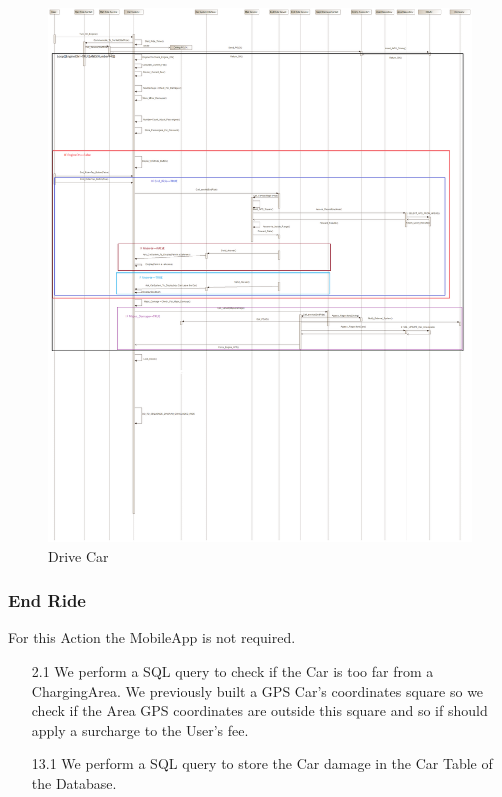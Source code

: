 \documentclass[12pt]{article}
\begin{document}
\begin{figure}[h]
\vspace{-2cm}
	\centering
	\includegraphics[width=.9\textwidth]{../Images/Sequence_Final/Drive_Car}
	\caption{Drive Car}
\end{figure}
\clearpage
\subsubsection{End Ride}
For this Action the MobileApp is not required.
\begin{enumerate}
	\item[2.1] We perform a SQL query to check if the Car is too far from a ChargingArea. We previously built a GPS Car’s coordinates square so we check if the Area GPS coordinates are outside this square and so if should apply a surcharge to the User’s fee.
	\item[13.1] We perform a SQL query to store the Car damage in the Car Table of the Database.
\end{enumerate}
\end{document}
